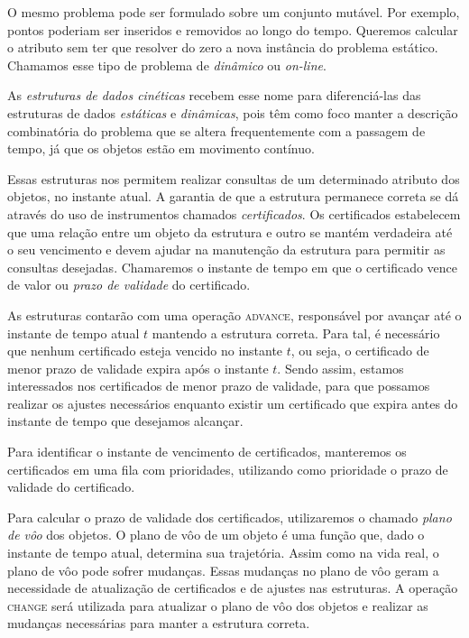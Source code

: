 O mesmo problema pode ser formulado sobre um conjunto mutável.
Por exemplo, pontos poderiam ser inseridos e removidos ao longo do tempo.
Queremos calcular o atributo sem ter que resolver do zero a nova instância do problema estático.
Chamamos esse tipo de problema de \textit{dinâmico} ou \textit{on-line}.

As \emph{estruturas de dados cinéticas} recebem esse nome para diferenciá-las
das estruturas de dados \textit{estáticas} e \textit{dinâmicas}, pois têm como
foco manter a descrição combinatória do problema que se altera frequentemente
com a passagem de tempo, já que os objetos estão em movimento contínuo.

Essas estruturas nos permitem realizar consultas de um determinado atributo dos
objetos, no instante atual.
A garantia de que a estrutura permanece correta se dá através do uso de instrumentos chamados \textit{certificados}.
Os certificados estabelecem que uma relação entre um objeto da estrutura e outro se
mantém verdadeira até o seu vencimento e devem ajudar na manutenção da estrutura
para permitir as consultas desejadas.
Chamaremos o instante de tempo em que o certificado vence de valor ou
\textit{prazo de validade} do certificado.

As estruturas contarão com uma operação \textsc{advance}, responsável por
avançar até o instante de tempo atual $t$ mantendo a estrutura correta.
Para tal, é necessário que nenhum certificado esteja vencido no instante $t$, ou seja, o
certificado de menor prazo de validade expira após o instante $t$.
Sendo assim, estamos interessados nos certificados de menor prazo de validade, para que
possamos realizar os ajustes necessários enquanto existir um certificado que
expira antes do instante de tempo que desejamos alcançar.

Para identificar o instante de vencimento de certificados, manteremos os certificados em uma fila
com prioridades, utilizando como prioridade o prazo de validade do certificado.

Para calcular o prazo de validade dos certificados, utilizaremos o chamado
\textit{plano de vôo} dos objetos.
O plano de vôo de um objeto é uma função que, dado o instante de tempo atual, determina sua trajetória.
Assim como na vida real, o plano de vôo pode sofrer mudanças.
Essas mudanças no plano de vôo geram a necessidade de atualização de certificados
e de ajustes nas estruturas.
A operação \textsc{change} será utilizada para atualizar o plano de vôo dos
objetos e realizar as mudanças necessárias para manter a estrutura correta.

